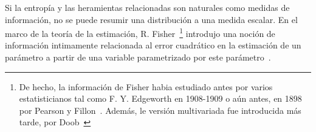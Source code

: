 \label{Ssec:SZ:Fisher}

Si la  entrop\'ia y las heramientas  relacionadas son naturales como  medidas de
informaci\'on, no se  puede resumir una distribuci\'on a una  medida escalar. En
el marco  de la teor\'ia  de la  estimaci\'on, R. Fisher~\footnote{De  hecho, la
informaci\'on de  Fisher habia  estudiado antes  por varios  estatisticianos tal
como  F.  Y.  Edgeworth  en 1908-1909  o  a\'un  antes, en  1898  por Pearson  y
Fillon~\cite{Hal06, Edg08,  PeaFil98}. Adem\'as,  le versi\'on  multivariada fue
introducida m\'as tarde, por Doob~\cite{Doo34, Doo36}} introdujo una noci\'on de
informaci\'on intimamente  relacionada al error cuadr\'atico  en la estimaci\'on
de   un  par\'ametro   a  partir   de  una   variable  parametrizado   por  este
par\'ametro~\cite{Fis22, Fis25:07, Kay93, LehCas08, Bos07, CovTho06, Fri04}.

